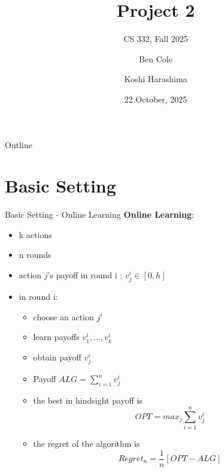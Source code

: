 \documentclass{beamer}
\title[Project 2]{Project 2}
\subtitle{CS 332, Fall 2025}
\author{Ben Cole \and Koshi Harashima}
\date{22 October, 2025}
\begin{document}
\maketitle

\begin{frame}{Outline}
  \tableofcontents
\end{frame}

\section{Basic Setting}

\begin{frame}{Basic Setting - Online Learning}
    \textbf{Online Learning}: 
    \begin{itemize}
        \item k actions
        \item n rounds
        \item action $j$'s payoff in round i ; $v_j^i \in [0,h]$
        \item in round i:
        \begin{itemize}
            \item choose an action $j^i$
            \item learn payoffs $v_1^i, \dots, v_k^i$
            \item obtain payoff $v_j^i$
        \item Payoff $ALG = \sum_{i = 1} ^n v_j^i$
        \item the best in hindsight payoff is 
        \[
        OPT = max_j \sum_{i = 1} ^n v_j^i
        \]
        \item the regret of the algorithm is 
        \[
        Regret_n = \frac{1}{n}[OPT - ALG]
        \]
        \end{itemize}   
    \end{itemize}
\end{frame}
\end{document}
